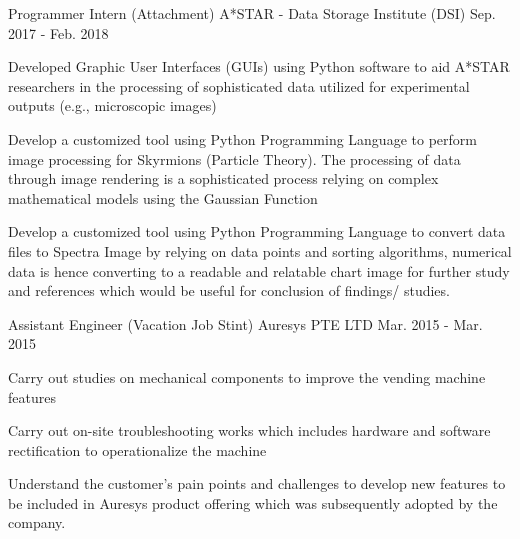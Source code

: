 \begin{cventries}
  \cventry
    {Programmer Intern (Attachment)} %
    {A*STAR - Data Storage Institute (DSI)} %
    {Sep. 2017 - Feb. 2018} %
    {} %
    {
      \begin{cvitems} %
        \item {Developed Graphic User Interfaces (GUIs) using Python software to aid A*STAR researchers in the processing of sophisticated data utilized for experimental outputs (e.g., microscopic images)}
        \item {Develop a customized tool using Python Programming Language to perform image processing for Skyrmions (Particle Theory). The processing of data through image rendering is a sophisticated process relying on complex mathematical models using the Gaussian Function}
        \item{Develop a customized tool using Python Programming Language to convert data files to Spectra Image by relying on data points and sorting algorithms, numerical data is hence converting to a readable and relatable chart image for further study and references which would be useful for conclusion of findings/ studies.}
      \end{cvitems}
    }
    
  \cventry
    {Assistant Engineer (Vacation Job Stint) } %
    {Auresys PTE LTD} %
    {Mar. 2015 - Mar. 2015} %
    {} %
    {
      \begin{cvitems} %
        \item {Carry out studies on mechanical components to improve the vending machine features}
        \item {Carry out on-site troubleshooting works which includes hardware and software rectification to operationalize the machine}
        \item{Understand the customer’s pain points and challenges to develop new features to be included in Auresys product offering which was subsequently adopted by the company. }
      \end{cvitems}
    }
\end{cventries}
